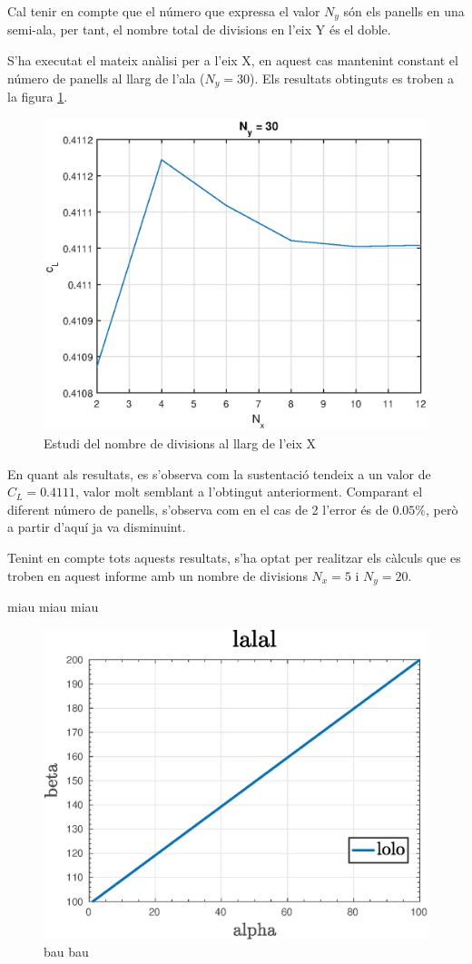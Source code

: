 Cal tenir en compte que el número que expressa el valor $N_{y}$ són els panells en una semi-ala, per tant, el nombre total de divisions en l'eix Y és el doble.

S'ha executat el mateix anàlisi per a l'eix X, en aquest cas mantenint constant el número de panells al llarg de l'ala ($N_{y}=30$). Els resultats obtinguts es troben a la figura \ref{nx}.

\begin{figure}[H]
	\centering
	\includegraphics[scale=0.95]{./plots/nxcl}
	\caption{Estudi del nombre de divisions al llarg de l'eix X}
	\label{nx}
\end{figure}

En quant als resultats, es s'observa com la sustentació tendeix a un valor de $C_{L}=0.4111$, valor molt semblant a l'obtingut anteriorment. Comparant el diferent número de panells, s'observa com en el cas de 2 l'error és de $0.05\%$, però a partir d'aquí ja va disminuint.

Tenint en compte tots aquests resultats, s'ha optat per realitzar els càlculs que es troben en aquest informe amb un nombre de divisions $N_{x}=5$ i $N_{y}=20$.

\newpage
miau miau miau
\begin{figure}[h]
		\includegraphics[width=\textwidth]{./plots/test}
		\caption{bau bau}
\end{figure}
